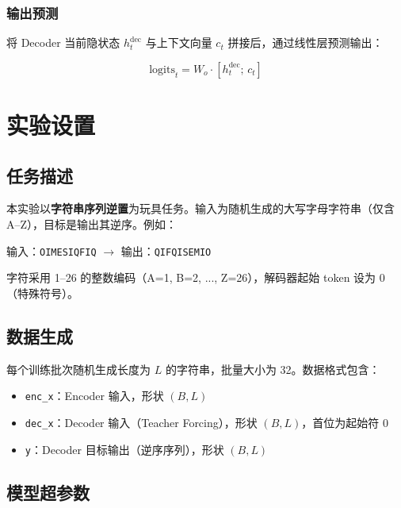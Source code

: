 \documentclass[12pt, a4paper]{article}
\begin{document}
\subsubsection{输出预测}

将 Decoder 当前隐状态 $h_t^{\text{dec}}$ 与上下文向量 $c_t$ 拼接后，通过线性层预测输出：

\begin{equation}
    \text{logits}_t = W_o \cdot [h_t^{\text{dec}};\, c_t]
\end{equation}

\section{实验设置}

\subsection{任务描述}

本实验以\textbf{字符串序列逆置}为玩具任务。输入为随机生成的大写字母字符串（仅含 A--Z），目标是输出其逆序。例如：

\begin{center}
    输入：\texttt{OIMESIQFIQ} \quad $\longrightarrow$ \quad 输出：\texttt{QIFQISEMIO}
\end{center}

字符采用 1--26 的整数编码（A=1, B=2, ..., Z=26），解码器起始 token 设为 0（特殊符号）。

\subsection{数据生成}

每个训练批次随机生成长度为 $L$ 的字符串，批量大小为 32。数据格式包含：

\begin{itemize}
    \item \texttt{enc\_x}：Encoder 输入，形状 $(B, L)$
    \item \texttt{dec\_x}：Decoder 输入（Teacher Forcing），形状 $(B, L)$，首位为起始符 0
    \item \texttt{y}：Decoder 目标输出（逆序序列），形状 $(B, L)$
\end{itemize}

\subsection{模型超参数}
\end{document}
